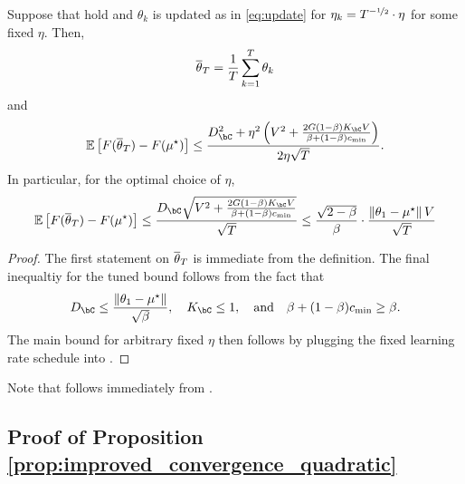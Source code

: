 \begin{corollary}\label{cor:convex_convergence_fixed_lr}
    Suppose that  hold and $\theta_k$ is updated as in \eqref{eq:update} for $\eta_k = T^{-\nicefrac 12} \cdot \eta$ for some fixed $\eta$.  Then,
    \begin{align}
        \overline{\theta}_T = \frac{1}{T} \sum_{k=1}^T \theta_k
    \end{align}
    and
    \begin{align}
        \ee\left[ F(\thetabar_T) - F(\mustar) \right] \leq \frac{D_{\bC}^2 + \eta^2 \left( V^2 + \frac{2 G (1 - \beta) K_{\bC} V}{\beta + (1 - \beta)\cmin} \right)}{2 \eta \sqrt{T}}.
    \end{align}
    In particular, for the optimal choice of $\eta$,
    \begin{align}
        \ee\left[ F(\thetabar_T) - F(\mustar) \right] \leq \frac{D_{\bC} \sqrt{V^2 + \frac{2 G (1 - \beta) K_{\bC} V}{\beta + (1 - \beta)\cmin} }}{\sqrt{T}} \leq  \frac{\sqrt{2 - \beta}}{\beta} \cdot \frac{\norm{\theta_1 - \mustar} V}{\sqrt{T}}
    \end{align}
\end{corollary}
\begin{proof}
    The first statement on $\overline{\theta}_T$ is immediate from the definition.  The final inequaltiy for the tuned bound follows from the fact that
    \begin{align}
        D_{\bC} \leq \frac{\norm{\theta_1 - \mustar}}{\sqrt{\beta}}, \quad K_{\bC} \leq 1, \quad \text{and} \quad \beta + (1 - \beta) \cmin \geq \beta.
    \end{align}
    The main bound for arbitrary fixed $\eta$ then follows by plugging the fixed learning rate schedule into .
\end{proof}

Note that  follows immediately from .















\subsection{Proof of Proposition \ref{prop:improved_convergence_quadratic}}\label{app:improved_convergence_quadratic}

